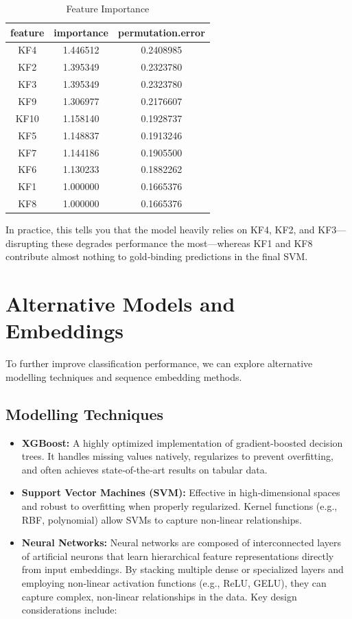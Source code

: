 \documentclass{article}
\begin{document}
\begin{table}[h!]
\centering
\label{tab:feature_importance}
\begin{tabular}{|c|c|c|}
\hline
\textbf{feature} & \textbf{importance} & \textbf{permutation.error} \\
\hline
KF4 & 1.446512 & 0.2408985 \\
KF2 & 1.395349 & 0.2323780 \\
KF3 & 1.395349 & 0.2323780 \\
KF9 & 1.306977 & 0.2176607 \\
KF10 & 1.158140 & 0.1928737 \\
KF5 & 1.148837 & 0.1913246 \\
KF7 & 1.144186 & 0.1905500 \\
KF6 & 1.130233 & 0.1882262 \\
KF1 & 1.000000 & 0.1665376 \\
KF8 & 1.000000 & 0.1665376 \\
\hline
\end{tabular}
\caption{Feature Importance}
\end{table}

In practice, this tells you that the model heavily relies on KF4, KF2, and KF3—disrupting these degrades performance the most—whereas KF1 and KF8 contribute almost nothing to gold‐binding predictions in the final SVM.

\section{Alternative Models and Embeddings}

To further improve classification performance, we can explore alternative modelling techniques and sequence embedding methods.

\subsection{Modelling Techniques}
\begin{itemize}
    \item \textbf{XGBoost:} A highly optimized implementation of gradient-boosted decision trees. It handles missing values natively, regularizes to prevent overfitting, and often achieves state‑of‑the‑art results on tabular data.
    \item \textbf{Support Vector Machines (SVM):} Effective in high‑dimensional spaces and robust to overfitting when properly regularized. Kernel functions (e.g., RBF, polynomial) allow SVMs to capture non‑linear relationships.
    \item \textbf{Neural Networks:} Neural networks are composed of interconnected layers of artificial neurons that learn hierarchical feature representations directly from input embeddings. By stacking multiple dense or specialized layers and employing non‑linear activation functions (e.g., ReLU, GELU), they can capture complex, non‑linear relationships in the data. Key design considerations include:
\end{itemize}
\end{document}
